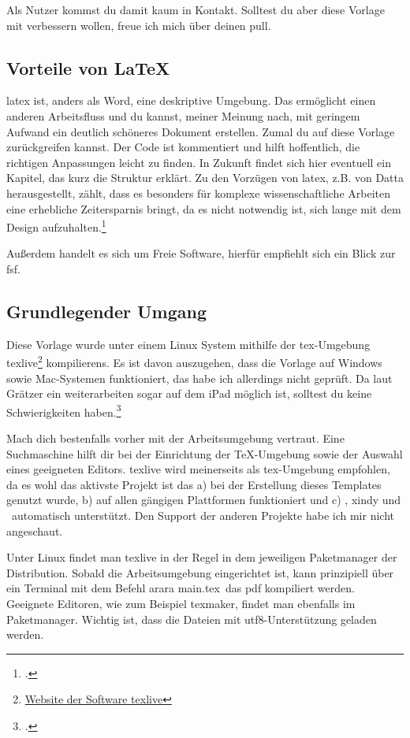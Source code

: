 Als Nutzer kommst du damit kaum in Kontakt. Solltest du aber diese Vorlage mit verbessern wollen, freue ich mich über deinen \gls{pull}.
\subsection{Vorteile von \protect\LaTeX{}}%
\label{sec:vort-von}
\gls{latex} ist, anders als Word, eine deskriptive Umgebung. Das ermöglicht einen anderen Arbeitsfluss und du kannst, meiner Meinung nach, mit geringem Aufwand ein deutlich schöneres Dokument erstellen. Zumal du auf diese Vorlage zurückgreifen kannst. Der Code ist kommentiert und hilft hoffentlich, die richtigen Anpassungen leicht zu finden. In Zukunft findet sich hier eventuell ein Kapitel, das kurz die Struktur erklärt.
Zu den Vorzügen von \gls{latex}, z.B. von Datta herausgestellt, zählt, dass es besonders für komplexe wissenschaftliche Arbeiten eine erhebliche Zeitersparnis bringt, da es nicht notwendig ist, sich lange mit dem Design aufzuhalten.\footcite[Vgl. ][S. 1f.]{datta_latex_2017}

Außerdem handelt es sich um Freie Software, hierfür empfiehlt sich ein Blick zur \gls{fsf}.
\subsection{Grundlegender Umgang}%
\label{sec:grundl}
Diese Vorlage wurde unter einem Linux System mithilfe der \gls{tex}-Umgebung texlive\footnote{\href{https://tug.org/texlive/}{Website der Software texlive}} \glspl{kompilieren}. Es ist davon auszugehen, dass die Vorlage auf Windows sowie Mac-Systemen funktioniert, das habe ich allerdings nicht geprüft. Da laut Grätzer ein weiterarbeiten sogar auf dem iPad möglich ist, solltest du keine Schwierigkeiten haben.\footcite[Vgl. ][S. 179ff]{gratzer_practical_2014}

Mach dich bestenfalls vorher mit der Arbeitsumgebung vertraut. Eine Suchmaschine hilft dir bei der Einrichtung der TeX-Umgebung sowie der Auswahl eines geeigneten Editors. texlive wird meinerseits als \gls{tex}-Umgebung empfohlen, da es wohl das aktivste Projekt ist das a) bei der Erstellung dieses Templates genutzt wurde, b) auf allen gängigen Plattformen funktioniert und c) \protect{}, xindy und \protect{}\ automatisch unterstützt. Den Support der anderen Projekte habe ich mir nicht angeschaut.

Unter Linux findet man texlive in der Regel in dem jeweiligen Paketmanager der Distribution. Sobald die Arbeitsumgebung eingerichtet ist, kann prinzipiell über ein Terminal mit dem Befehl \glqq arara main.tex\grqq\ das pdf kompiliert werden.
Geeignete Editoren, wie zum Beispiel texmaker, findet man ebenfalls im Paketmanager. Wichtig ist, dass die Dateien mit \gls{utf8}-Unterstützung geladen werden.

